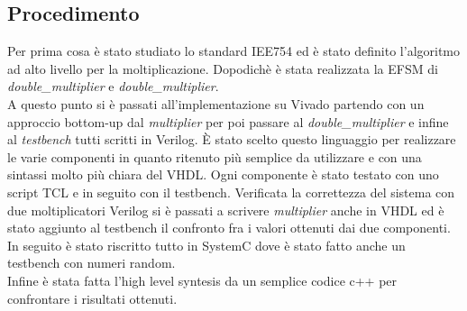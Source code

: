 \documentclass[]{IEEEtran}
\begin{document}
\subsection{Procedimento}
Per prima cosa è stato studiato lo standard IEE754 ed è stato definito l'algoritmo ad alto livello per la moltiplicazione. Dopodichè è stata realizzata la EFSM di \textit{double\_multiplier} e \textit{double\_multiplier}.
\\A questo punto si è passati all'implementazione su Vivado\cite{Vivado} partendo con un approccio bottom-up dal \textit{multiplier} per poi passare al \textit{double\_multiplier} e infine al \textit{testbench} tutti scritti in Verilog. È stato scelto questo linguaggio per realizzare le varie componenti in quanto ritenuto più semplice da utilizzare e con una sintassi molto più chiara del VHDL. Ogni componente è stato testato con uno script TCL e in seguito con il testbench. Verificata la correttezza del sistema con due moltiplicatori Verilog si è passati a scrivere \textit{multiplier} anche in VHDL ed è stato aggiunto al testbench il confronto fra i valori ottenuti dai due componenti.
\\In seguito è stato riscritto tutto in SystemC dove è stato fatto anche un testbench con numeri random.
\\Infine è stata fatta l'high level syntesis da un semplice codice c++ per confrontare i risultati ottenuti.
\end{document}

